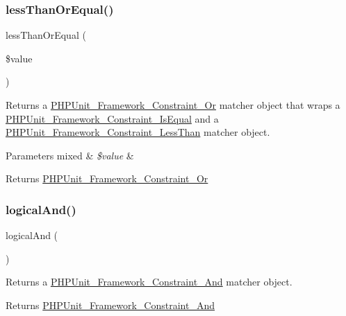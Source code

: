 \subsubsection{\texorpdfstring{less\+Than\+Or\+Equal()}{lessThanOrEqual()}}
{\footnotesize\ttfamily less\+Than\+Or\+Equal (\begin{DoxyParamCaption}\item[{}]{\$value }\end{DoxyParamCaption})}

Returns a \mbox{\hyperlink{class_p_h_p_unit___framework___constraint___or}{P\+H\+P\+Unit\+\_\+\+Framework\+\_\+\+Constraint\+\_\+\+Or}} matcher object that wraps a \mbox{\hyperlink{class_p_h_p_unit___framework___constraint___is_equal}{P\+H\+P\+Unit\+\_\+\+Framework\+\_\+\+Constraint\+\_\+\+Is\+Equal}} and a \mbox{\hyperlink{class_p_h_p_unit___framework___constraint___less_than}{P\+H\+P\+Unit\+\_\+\+Framework\+\_\+\+Constraint\+\_\+\+Less\+Than}} matcher object.


\begin{DoxyParams}[1]{Parameters}
mixed & {\em \$value} & \\
\hline
\end{DoxyParams}
\begin{DoxyReturn}{Returns}
\mbox{\hyperlink{class_p_h_p_unit___framework___constraint___or}{P\+H\+P\+Unit\+\_\+\+Framework\+\_\+\+Constraint\+\_\+\+Or}} 
\end{DoxyReturn}
\mbox{\label{_functions_8php_ae731cc8816139b076c1f231cc29628f6}} 
\subsubsection{\texorpdfstring{logical\+And()}{logicalAnd()}}
{\footnotesize\ttfamily logical\+And (\begin{DoxyParamCaption}{ }\end{DoxyParamCaption})}

Returns a \mbox{\hyperlink{class_p_h_p_unit___framework___constraint___and}{P\+H\+P\+Unit\+\_\+\+Framework\+\_\+\+Constraint\+\_\+\+And}} matcher object.

\begin{DoxyReturn}{Returns}
\mbox{\hyperlink{class_p_h_p_unit___framework___constraint___and}{P\+H\+P\+Unit\+\_\+\+Framework\+\_\+\+Constraint\+\_\+\+And}} 
\end{DoxyReturn}
\mbox{\label{_functions_8php_a6b3abe020c7872df97f29de1e16cf485}} 
